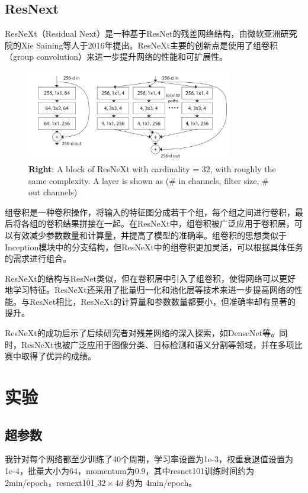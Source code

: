 \documentclass[10.5pt,a4paper]{article}%
\begin{document}
        \subsection{ResNext}
        ResNeXt（Residual Next）是一种基于ResNet的残差网络结构，由微软亚洲研究院的Xie Saining等人于2016年提出\cite{xie2017aggregated}。ResNeXt主要的创新点是使用了组卷积（group convolution）来进一步提升网络的性能和可扩展性。\par
        \begin{figure}[H]
        \centering
            \includegraphics[width=0.8\textwidth]{resnext.png}
          \caption{\textbf{Right}: A block of ResNeXt with cardinality = 32, with roughly the same complexity. A layer is shown as (\# in channels, filter size, \# out channels)\cite{xie2017aggregated}}
          \label{fig:resnext_resnet}
        \end{figure}
        组卷积是一种卷积操作，将输入的特征图分成若干个组，每个组之间进行卷积，最后将各组的卷积结果拼接在一起。在ResNeXt中，组卷积被广泛应用于卷积层，可以有效减少参数数量和计算量，并提高了模型的准确率。组卷积的思想类似于Inception模块中的分支结构，但ResNeXt中的组卷积更加灵活，可以根据具体任务的需求进行组合。\par
        ResNeXt的结构与ResNet类似，但在卷积层中引入了组卷积，使得网络可以更好地学习特征。ResNeXt还采用了批量归一化和池化层等技术来进一步提高网络的性能。与ResNet相比，ResNeXt的计算量和参数数量都要小，但准确率却有显著的提升。\par
        ResNeXt的成功启示了后续研究者对残差网络的深入探索，如DenseNet\cite{densenet}等。同时，ResNeXt也被广泛应用于图像分类、目标检测和语义分割等领域，并在多项比赛中取得了优异的成绩。
        \section{实验}
        \subsection{超参数}
        我针对每个网络都至少训练了40个周期，学习率设置为1e-3，权重衰退值设置为1e-4，批量大小为64，momentum为0.9，其中resnet101训练时间约为2min/epoch，resnext101$\_ 32 \times 4d$ 约为 4min/epoch。\par
\end{document}
